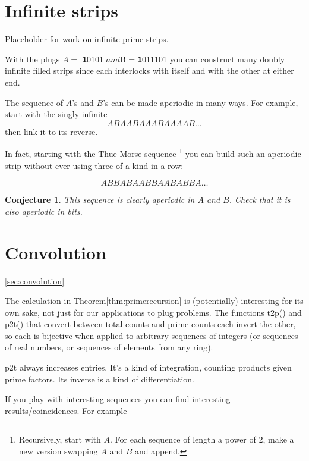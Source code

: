 \documentclass[10pt]{article}
\newtheorem{conjecture}[theorem]{Conjecture}
\numberwithin{equation}{section}
\newenvironment{anote}
               {{\textcolor{blue}{Note:}}
                 \itshape
               }
               {}
\newcommand{\plug}[1]{%
\mbox{{\textbf\texttt #1}}
}
\begin{document}
\section{Infinite strips}

\begin{anote}
Placeholder for work on infinite prime strips.
\end{anote}

With the plugs $A = $\plug{10101}$ and $B = \plug{1011101} you can construct many doubly infinite filled strips since each interlocks with itself and with the other at either end. 

The sequence of $A$'s and $B$'s can be made aperiodic in many ways. For example, start with the singly infinite
\begin{equation}
    ABAABAAABAAAAB\ldots
\end{equation}
then link it to its reverse.

In fact, starting with the \href{https://en.wikipedia.org/wiki/Thue-Morse_sequence}{Thue Morse sequence}
\footnote{ Recursively, start with $A$. For each sequence of length a power of 2, make a new version swapping $A$ and $B$ and append.}
you can build such an aperiodic strip without ever using three of a kind in a row:  

\begin{equation*}
  A B  BA BAAB BAABABBA \ldots  
\end{equation*}

\begin{conjecture}
This sequence is clearly aperiodic in $A$ and $B$. Check that it is also aperiodic in bits.
\end{conjecture}
\section{Convolution}\ref{sec:convolution}

The calculation in Theorem\ref{thm:primerecursion} is (potentially) interesting for its own sake, not just for our applications to plug problems. The functions t2p() and p2t() that convert between total counts and prime counts each invert the other, so each is bijective when applied to arbitrary sequences of integers (or sequences of real numbers, or sequences of elements from any ring).

p2t always increases entries. It's a kind of integration, counting products given prime factors. Its inverse is a kind of differentiation. 

If you play with interesting sequences you can find interesting results/coincidences. For example
\end{document}
